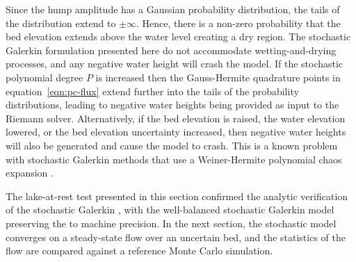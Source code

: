 Since the hump amplitude has a Gaussian probability distribution, the tails of the distribution extend to $\pm \infty$.
Hence, there is a non-zero probability that the bed elevation extends above the water level creating a dry region.
The stochastic Galerkin formulation presented here do not accommodate wetting-and-drying processes, and any negative water height will crash the model.
If the stochastic polynomial degree $P$ is increased then the Gauss-Hermite quadrature points in equation~\eqref{eqn:pc-flux} extend further into the tails of the probability distributions, leading to negative water heights being provided as input to the Riemann solver.
Alternatively, if the bed elevation is raised, the water elevation lowered, or the bed elevation uncertainty increased, then negative water heights will also be generated and cause the model to crash.
This is a known problem with stochastic Galerkin methods that use a Weiner-Hermite polynomial chaos expansion \citep{pettersson2014}.

The lake-at-rest test presented in this section confirmed the analytic verification of the stochastic Galerkin \cproperty, with the well-balanced stochastic Galerkin model preserving the \cproperty{} to machine precision.
In the next section, the stochastic model converges on a steady-state flow over an uncertain bed, and the statistics of the flow are compared against a reference Monte Carlo simulation.

